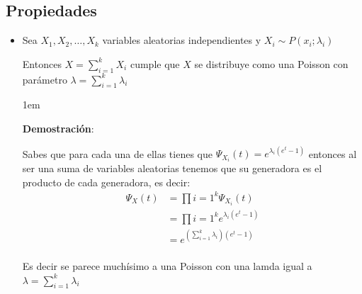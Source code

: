 \documentclass[12pt, fleqn]{report}                             %
\newenvironment{SmallIndentation}[1][0.75em]                    %
        {\begin{adjustwidth}{#1}{}\begin{footnotesize}}             %
        {\end{footnotesize}\end{adjustwidth}}                       %
\theoremstyle{break}                                            %
\begin{document}
            \subsection{Propiedades}

                \begin{itemize}
                    
                    \item 
                        Sea $X_1, X_2, \dots, X_k$ variables aleatorias independientes
                        y $X_i \sim P(x_i; \lambda_i)$ 

                        Entonces $X = \sum_{i = 1}^k X_i$ cumple que $X$ se distribuye como
                        una Poisson con parámetro $\lambda = \sum_{i=1}^k \lambda_i$

                        \begin{SmallIndentation}[1em]
                            \textbf{Demostración}:

                            Sabes que para cada una de ellas tienes que $\Psi_{X_i}(t) = e^{\lambda_i(e^t - 1)}$
                            entonces al ser una suma de variables aleatorias tenemos que su generadora
                            es el producto de cada generadora, es decir:
                            \begin{align*}
                                \Psi_X(t) 
                                    &= \prod{i=1}^k \Psi_{X_i}(t)                 \\
                                    &= \prod{i=1}^k e^{\lambda_i(e^t - 1)}        \\
                                    &= e^{(\sum_{i=1}^k\lambda_i)(e^t - 1)}        \\
                            \end{align*}

                            Es decir se parece muchísimo a una Poisson con una lamda igual a
                            $\lambda = \sum_{i=1}^k \lambda_i$
                        
                        \end{SmallIndentation}

                \end{itemize}
            





\end{document}
